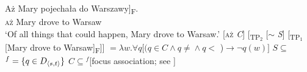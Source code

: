 \documentclass[output=paper,colorlinks,citecolor=brown]{langscibook}
\begin{document}
\ea\label{ex:tom:84}
\gll Aż \minsp{[} Mary pojechała do Warszawy]\textsubscript{F}.   \\
\textsc{aż} {} Mary drove to Warsaw\\
\glt ‘Of all things that could happen, Mary drove to Warsaw.'
\ea\label{ex:tom:84b}      
[\textsc{aż} \textit{C}] [\textsubscript{TP$_2$} [$\sim$ \textit{S}] [\textsubscript{TP$_1$} [Mary drove to Warsaw]\textsubscript{F}]]
\ex\label{ex:tom:84c}      
${}= λw.\forall q[(q\in C\wedge q\neq{}$${}\wedge q <{}$ )${}→ ¬ q(w)]$
\ex\label{ex:tom:84d}      
$S\subseteq{}$ $^f=\{q\in D_{\langle{s,t}\rangle}\}$
\ex\label{ex:tom:84e} 
$C\subseteq{}$$^f$\hfill [focus association; see ]
\z 
\z 
\end{document}
